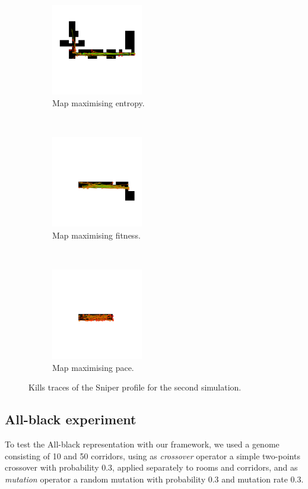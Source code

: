 \begin{figure}[H]
    \centering
    \begin{subfigure}[t]{0.3\textwidth}
        \centering
        \includegraphics[height=4.0cm]{Images/images/experiment_one/best_entropy_pop_1/kill_traces_bot_1.png}
        \caption{Map maximising entropy.}
    \end{subfigure}%
    ~ 
    \begin{subfigure}[t]{0.3\textwidth}
        \centering
        \includegraphics[height=4.0cm]{Images/images/experiment_one/best_fitness_pop_1/kill_traces_bot_1.png}
        \caption{Map maximising fitness.}
    \end{subfigure}
    ~ 
    \begin{subfigure}[t]{0.3\textwidth}
        \centering
        \includegraphics[height=4.0cm]{Images/images/experiment_one/best_pace_pop_1/kill_traces_bot_1.png}
        \caption{Map maximising pace.}
    \end{subfigure}
    \caption{Kills traces of the Sniper profile for the second simulation.}
    \label{fig:ex_one_end_heatmaps}
\end{figure}

\newpage

\subsection{All-black experiment}
To test the All-black representation with our framework, we used a genome consisting of 10 and 50 corridors, using as \textit{crossover} operator a simple two-points crossover with probability 0.3, applied separately to rooms and corridors, and as \textit{mutation} operator a random mutation with probability 0.3 and mutation rate 0.3.

